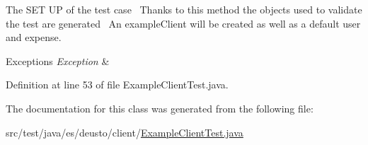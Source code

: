 The S\+ET UP of the test case~\newline
Thanks to this method the objects used to validate the test are generated~\newline
An example\+Client will be created as well as a default user and expense. 
\begin{DoxyExceptions}{Exceptions}
{\em Exception} & \\
\hline
\end{DoxyExceptions}


Definition at line 53 of file Example\+Client\+Test.\+java.



The documentation for this class was generated from the following file\+:\begin{DoxyCompactItemize}
\item 
src/test/java/es/deusto/client/\hyperlink{_example_client_test_8java}{Example\+Client\+Test.\+java}\end{DoxyCompactItemize}
